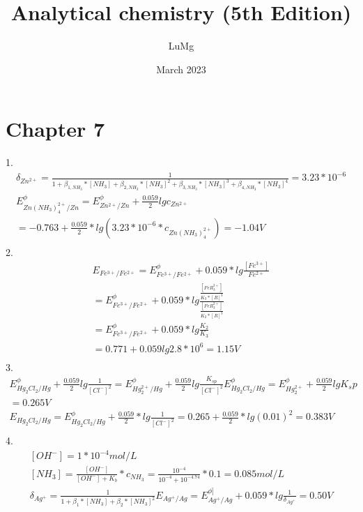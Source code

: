 \documentclass{article}
\title{Analytical chemistry (5th Edition)}
\author{LuMg}
\date{March 2023}
\begin{document}
\maketitle

\section{Chapter 7}
1.\begin{equation}
    \begin{multlined}
    \delta_{Zn^{2+}} = \frac{1}{1 + \beta_{1, NH_3}*\left[NH_3\right] + \beta_{2, NH_3}*\left[NH_3\right]^2 + \beta_{3, NH_3}*\left[NH_3\right]^3 + \beta_{4, NH_3}*\left[NH_3\right]^4} = 3.23*10^{-6}\\
    E^{\phi}_{Zn(NH_3)_4^{2+}/Zn} = E^{\phi}_{Zn^{2+}/Zn} + \frac{0.059}{2}lgc_{Zn^{2+}}\\
    = -0.763 + \frac{0.059}{2}*lg(3.23*10^{-6}*c_{Zn(NH_3)_4^{2+}}) = -1.04V\\
    \end{multlined}
\end{equation}
2.\begin{equation}
    \begin{multlined}
        E_{Fe^{3+}/Fe^{2+}} = E^{\phi}_{Fe^{3+}/Fe^{2+}} + 0.059*lg\frac{[Fe^{3+}]}{Fe^{2+}}\\
        = E^{\phi}_{Fe^{3+}/Fe^{2+}} + 0.059*lg\frac{\frac{[FeR_3^{3+}]}{K_3*[R]^3}}{\frac{[FeR_3^{2+}]}{K_2*[R]^3}}\\
        = E^{\phi}_{Fe^{3+}/Fe^{2+}} + 0.059*lg\frac{K_2}{K_3}\\
        = 0.771 + 0.059lg2.8*10^6 = 1.15 V\\
    \end{multlined}
\end{equation}
3.\begin{equation}
    \begin{multlined}
        E^{\phi}_{Hg_2Cl_2/Hg} + \frac{0.059}{2}lg\frac{1}{[Cl^-]^2} = E^{\phi}_{Hg_2^{2+}/Hg} + \frac{0.059}{2}lg\frac{K_{sp}}{[Cl^-]^2}
        E^{\phi}_{Hg_2Cl_2/Hg} = E^{\phi}_{Hg_2^{2+}} + \frac{0.059}{2}lgK_sp\\
        = 0.265 V\\
        E_{Hg_2Cl_2/Hg} = E^{\phi}_{Hg_2Cl_2/Hg} + \frac{0.059}{2}*lg\frac{1}{[Cl^-]^2} = 0.265 + \frac{0.059}{2}*lg(0.01)^2 = 0.383 V\\
    \end{multlined}
\end{equation}
4.\begin{equation}
    \begin{multlined}
        [OH^-] = 1*10^{-4} mol/L\\
        [NH_3] = \frac{[OH^-]}{[OH^-]+K_b}*c_{NH_3} = \frac{10^{-4}}{10^{-4} + 10^{-4.74}}* 0.1 = 0.085 mol/L\\
        \delta_{Ag^+} = \frac{1}{1 + \beta_1*[NH_3] + \beta_2*[NH_3]^2}
        E_{Ag^+/Ag} = E^{\phi]}_{Ag^+/Ag} + 0.059 * lg\frac{1}{\delta_{Ag^+}} = 0.50 V\\
    \end{multlined}
\end{equation}
\end{document}
